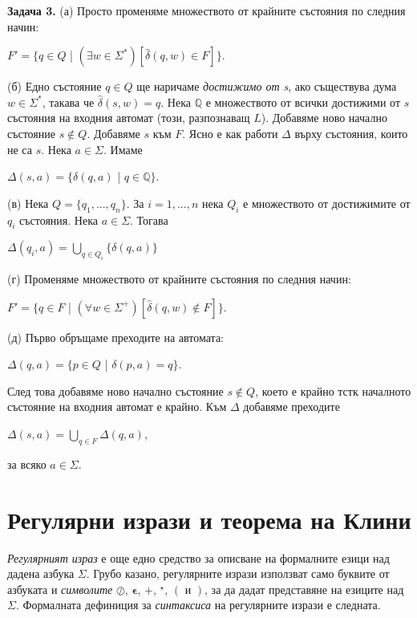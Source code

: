 \documentclass[openany]{book}
\newcommand{\bleft}{
    \boldsymbol{\left(\right.}
}
\newcommand{\bright}{
    \boldsymbol{\left.\right)}
}
\newcommand{\bplus}{
    \boldsymbol{+}
}
\newcommand{\bepsilon}{
    \boldsymbol{\epsilon}
}
\begin{document}
        \textbf{Задача 3.} (а) Просто променяме множеството от крайните състояния по следния
        начин:
        \begin{center}
          $F' = \{q \in Q$ | $(\exists w \in \Sigma^*)[\hat{\delta}(q,w) \in F]\}$.
        \end{center}
        (б) Едно състояние $q \in Q$ ще наричаме \textit{достижимо от s}, ако съществува дума
        $w \in \Sigma^*$, такава че $\hat{\delta}(s,w) = q$. Нека $\mathbb{Q}$
        е множеството от всички достижими от $s$ състояния на входния автомат 
        (този, разпознаващ $L$). Добавяме ново начално състояние $s \notin Q$. Добавяме $s$ към $F$.
        Ясно е как работи $\Delta$ върху състояния, които не са $s$. Нека $a \in \Sigma$. Имаме
        \begin{center}
          $\Delta(s,a) = \{\delta(q,a)$ | $q \in \mathbb{Q}\}$.
        \end{center}
        (в) Нека $Q = \{q_1,...,q_n\}$. За $i=1,...,n$ нека $Q_i$ е множеството от достижимите
        от $q_i$ състояния. Нека $a \in \Sigma$. Тогава
        \begin{center}
          $\Delta(q_i,a) = \bigcup\limits_{q \in Q_i} \{\delta(q,a)\}$ 
        \end{center}
        (г) Променяме множеството от крайните състояния по следния начин:
        \begin{center}
          $F' = \{q \in F$ | $(\forall w \in \Sigma^+)[\hat{\delta}(q,w) \notin F]\}$.
        \end{center}
        (д) Първо обръщаме преходите на автомата:
        \begin{center}
          $\Delta(q,a) = \{p \in Q$ | $\delta(p,a) = q\}$.
        \end{center}
        След това добавяме ново начално състояние $s \notin Q$, което е крайно тстк началното
        състояние на входния автомат е крайно. Към $\Delta$ добавяме преходите
        \begin{center}
          $\Delta(s,a) = \bigcup\limits_{q \in F} \Delta(q,a)$,
        \end{center}
        за всяко $a \in \Sigma$.

        \vspace{15pt}

        \section{Регулярни изрази и теорема на Клини}
        \hspace{15pt} \textit{Регулярният израз} е още едно средство за описване на формалните езици 
            над дадена азбука $\Sigma$. Грубо казано, регулярните изрази използват само буквите
            от азбуката и \textit{символите} $\oslash$, $\bepsilon$, $\bplus$, $^\star$, $\bleft$ и $\bright$, за да дадат 
            представяне на езиците над $\Sigma$. Формалната дефиниция за \textit{синтаксиса} на 
            регулярните изрази е следната.
        
\end{document}
